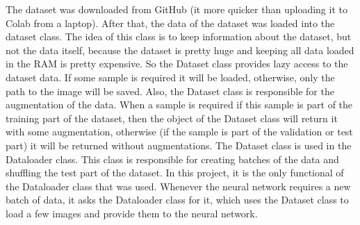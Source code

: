 The dataset was downloaded from GitHub (it more quicker than uploading it to Colab from a laptop). After that, the data of the dataset was loaded into the dataset class.
The idea of this class is to keep information about the dataset, but not the data itself, because the dataset is pretty huge and keeping all data loaded in the RAM is pretty expensive.
So the Dataset class provides lazy access to the dataset data. If some sample is required it will be loaded, otherwise, only the path to the image will be saved. Also,
the Dataset class is responsible for the augmentation of the data. When a sample is required if this sample is part of the training part of the dataset, then the object 
of the Dataset class will return it with some augmentation, otherwise (if the sample is part of the validation or test part) it will be returned without augmentations.
The Dataset class is used in the Dataloader class. This class is responsible for creating batches of the data and shuffling the test part of the dataset. In this project, it is 
the only functional of the Dataloader class that was used. Whenever the neural network requires a new batch of data, it asks the Dataloader class for it, which uses the Dataset class to load
a few images and provide them to the neural network.

